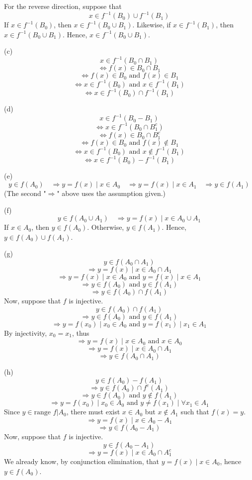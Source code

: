 \documentclass{book}
\begin{document}
For the reverse direction, suppose that
$$x \in f^{-1}(B_0) \cup f^{-1}(B_1)$$
If $x \in f^{-1}(B_0)$, then $x \in f^{-1}(B_0 \cup B_1)$. Likewise, if $x \in f^{-1}(B_1)$, then $x \in f^{-1}(B_0 \cup B_1)$. Hence, $x \in f^{-1}(B_0 \cup B_1)$.

\noindent
(c)
$$x \in f^{-1}(B_0 \cap B_1)$$
$$\Leftrightarrow f(x) \in B_0 \cap B_1$$
$$\Leftrightarrow f(x) \in B_0 \text{ and } f(x) \in B_1$$
$$\Leftrightarrow x \in f^{-1}(B_0) \text{ and } x \in f^{-1}(B_1)$$
$$\Leftrightarrow x \in f^{-1}(B_0) \cap f^{-1}(B_1)$$

\noindent
(d)
$$x \in f^{-1}(B_0 - B_1)$$
$$\Leftrightarrow x \in f^{-1}(B_0 \cap B_1^c)$$
$$\Leftrightarrow f(x) \in B_0 \cap B_1^c$$
$$\Leftrightarrow f(x) \in B_0 \text{ and } f(x) \not \in B_1$$
$$\Leftrightarrow x \in f^{-1}(B_0) \text{ and } x \not \in f^{-1}(B_1)$$
$$\Leftrightarrow x \in f^{-1}(B_0) - f^{-1}(B_1)$$

\noindent
(e)
$$y \in f(A_0) \quad \Rightarrow y = f(x) \mid x \in A_0 \quad \Rightarrow y = f(x) \mid x \in A_1 \quad \Rightarrow y \in f(A_1)$$
(The second "$\Rightarrow$" above uses the assumption given.)

\noindent
(f)
$$y \in f(A_0 \cup A_1) \quad \Rightarrow y = f(x) \mid x \in A_0 \cup A_1$$
If $x \in A_0$, then $y \in f(A_0)$. Otherwise, $y \in f(A_1)$. Hence, $y \in f(A_0) \cup f(A_1)$.

\noindent
(g)
$$y \in f(A_0 \cap A_1)$$
$$\Rightarrow y = f(x) \mid x \in A_0 \cap A_1$$
$$\Rightarrow y = f(x) \mid x \in A_0 \text{ and } y = f(x) \mid x \in A_1$$
$$\Rightarrow y \in f(A_0) \text{ and } y \in f(A_1)$$
$$\Rightarrow y \in f(A_0) \cap f(A_1)$$
Now, suppose that $f$ is injective.
$$y \in f(A_0) \cap f(A_1)$$
$$\Rightarrow y \in f(A_0) \text{ and } y \in f(A_1)$$
$$\Rightarrow y = f(x_0) \mid x_0 \in A_0 \text{ and } y = f(x_1) \mid x_1 \in A_1$$
By injectivity, $x_0 = x_1$, thus
$$\Rightarrow y = f(x) \mid x \in A_0 \text{ and } x \in A_0$$
$$\Rightarrow y = f(x) \mid x \in A_0 \cap A_1$$
$$\Rightarrow y \in f(A_0 \cap A_1)$$

\noindent
(h)
$$y \in f(A_0) - f(A_1)$$
$$\Rightarrow y \in f(A_0) \cap f^c(A_1)$$
$$\Rightarrow y \in f(A_0) \text{ and } y \not \in f(A_1)$$
$$\Rightarrow y = f(x_0) \mid x_0 \in A_0 \text{ and } y \neq f(x_1) \mid \forall x_1 \in A_1$$
Since $y \in \text{range } f|A_0$, there must exist $x \in A_0$ but $x \not \in A_1$ such that $f(x) = y$.
$$\Rightarrow y = f(x) \mid x \in A_0 - A_1$$
$$\Rightarrow y \in f(A_0 - A_1)$$
Now, suppose that $f$ is injective.
$$y \in f(A_0 - A_1)$$
$$\Rightarrow y = f(x) \mid x \in A_0 \cap A_1^c$$
We already know, by conjunction elimination, that $y = f(x) \mid x \in A_0$, hence $y \in f(A_0)$.
\end{document}
